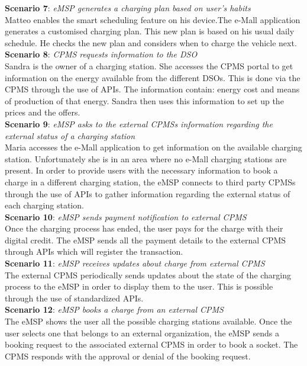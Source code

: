 \documentclass[12pt]{report}
\begin{document}
\textbf{Scenario 7}: \emph{eMSP generates a charging plan based on user’s habits}\\
    Matteo enables the smart scheduling feature on his device.The e-Mall application generates a customised charging plan. This new plan is based on his usual daily schedule. He checks the new plan and considers when to charge the vehicle next.\\
 

\textbf{Scenario 8}: \emph{CPMS requests information to the DSO}\\
    Sandra is the owner of a charging station. She accesses the CPMS portal to get information on the energy available from the different DSOs. This is done via the CPMS through the use of APIs. The information contain: energy cost and means of production of that energy. Sandra then uses this information to set up the prices and the offers.\\
 

\textbf{Scenario 9}: \emph{eMSP asks to the external CPMSs information regarding the external status of a charging station}\\
    Maria accesses the e-Mall application to get information on the available charging station. Unfortunately she is in an area where no e-Mall charging stations are present. In order to provide users with the necessary information to book a charge in a different charging station, the eMSP connects to third party CPMSs through the use of APIs to gather information regarding the external status of each charging station.\\
 

\textbf{Scenario 10}: \emph{eMSP sends payment notification to external CPMS}\\ 
    Once the charging process has ended, the user pays for the charge with their digital credit. The eMSP sends all the payment details to the external CPMS through APIs which will register the transaction.\\
 

\textbf{Scenario 11}: \emph{eMSP receives updates about charge from external CPMS}\\
    The external CPMS periodically sends updates about the state of the charging process to the eMSP in order to display them to the user. This is possible through the use of standardized APIs.\\
 

\textbf{Scenario 12}: \emph{eMSP books a charge from an external CPMS}\\
    The eMSP shows the user all the possible charging stations available. Once the user selects one that belongs to an external organization, the eMSP sends a booking request to the associated external CPMS in order to book a socket. The CPMS responds with the approval or denial of the booking request.\\
 
\end{document}
